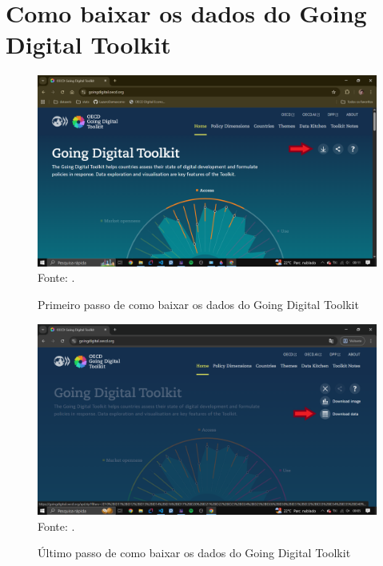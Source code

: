 \chapter{Como baixar os dados do Going Digital Toolkit}
\label{como_baixar_dados_going_digital}

\begin{figure}[H]
	\centering
	\caption{Primeiro passo  de como baixar os dados do Going Digital Toolkit}
	\includegraphics[width=1\linewidth]{figuras/primeiro_passo}
	\label{fig:primeiro_passo}
	\footnotesize{Fonte: \cite{portal_going_digital}.}
\end{figure}

\begin{figure}[H]
	\centering
	\caption{Último passo de como baixar os dados do Going Digital Toolkit}
	\includegraphics[width=1\linewidth]{figuras/segundo_passo}
	\label{fig:segundo_passo}
	\footnotesize{Fonte: \cite{portal_going_digital}.}
\end{figure}
